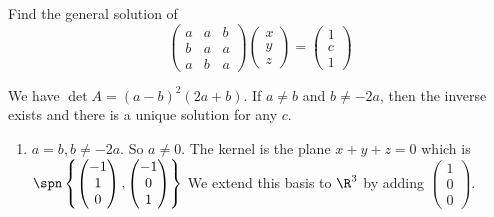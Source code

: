 \documentclass[a4paper]{article}
\begin{document}
\begin{eg}
  Find the general solution of
  \[
    \begin{pmatrix}
      a & a & b\\
      b & a & a\\
      a & b & a
    \end{pmatrix}
    \begin{pmatrix}
      x\\y\\z
    \end{pmatrix}
    =\begin{pmatrix}
      1\\c\\1
    \end{pmatrix}
  \]

  We have $\det A = (a - b)^2 (2a + b)$. If $a \not= b$ and $b \not= -2a$, then the inverse exists and there is a unique solution for any $c$.
  \begin{enumerate}
    \item $a = b, b \not= -2a$. So $a\not= 0$. The kernel is the plane $x + y + z = 0$ which is $\spn\left\{
        \begin{pmatrix}
          -1\\1\\0
        \end{pmatrix},
        \begin{pmatrix}
          -1\\ 0\\ 1
        \end{pmatrix}\right\}$
        We extend this basis to $\R^3$ by adding $
        \begin{pmatrix}
          1\\0\\0
        \end{pmatrix}$.


\end{enumerate}
\end{eg}
\end{document}

